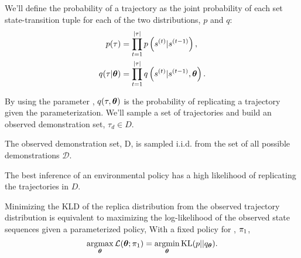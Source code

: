 

    We'll define the probability of a trajectory as the joint probability of each set state-transition tuple for each of
    the two distributions, $p$ and $q$:
    \begin{align*}
        p(\tau) &= \prod_{t=1}^{|\tau|}p\left( s^{(t)}| s^{(t-1)} \right), \\
        q(\tau|\boldsymbol{\mathbb{\theta}}) &= \prod_{t=1}^{|\tau|}q\left(s^{(t)}| s^{(t-1)}, \boldsymbol{\mathbb{\theta}}\right).
    \end{align*}

    \noindent
    By using the parameter \paramVec, $q(\tau,\boldsymbol{\mathbb{\theta}})$ is the probability of replicating a trajectory given the
    parameterization. We'll sample a set of trajectories and build an observed demonstration set, $\tau_d \in D$.

    \begin{assumption}
        The observed demonstration set, D, is sampled i.i.d. from the set of all possible demonstrations $\mathcal{D}$.
    \end{assumption}

    The best inference of an environmental policy has a high likelihood of replicating the trajectories in $D$.
    \begin{lemma}\label{lemma:obj_fun_equiv}
        Minimizing the \ac{KLD} of the replica distribution from the observed trajectory distribution is equivalent to
        maximizing the log-likelihood of the observed state sequences given a parameterized policy, With a fixed policy
        for , $\pi_{1}$,
        \begin{equation*}
            \mathop{\mathrm{argmax}}_{\boldsymbol{\mathbb{\theta}}} \mathcal{L}(\boldsymbol{\mathbb{\theta}}; \pi_{1}) = \mathop{\mathrm{argmin}}_{\boldsymbol{\mathbb{\theta}}} \text{KL}(p||q_{\boldsymbol{\mathbb{\theta}}}).
        \end{equation*}
    \end{lemma}

